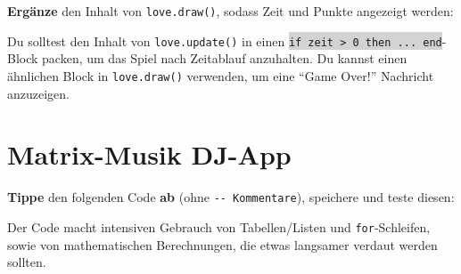 \documentclass[a4paper, 11pt]{article}
\begin{document}
\textbf{Ergänze} den Inhalt von \texttt{love.draw()}, sodass Zeit und Punkte angezeigt werden:



Du solltest den Inhalt von \texttt{love.update()} in einen \colorbox{lightgray}{\texttt{if zeit > 0 then ... end}}-Block packen, um das Spiel nach Zeitablauf anzuhalten. Du kannst einen ähnlichen Block in \texttt{love.draw()} verwenden, um eine "`Game Over!"' Nachricht anzuzeigen.

\newpage

\section{Matrix-Musik DJ-App}

\textbf{Tippe} den folgenden Code \textbf{ab} (ohne \texttt{-{}- Kommentare}), speichere und teste diesen:



Der Code macht intensiven Gebrauch von Tabellen/Listen und \texttt{for}-Schleifen, sowie von mathematischen Berechnungen, die etwas langsamer verdaut werden sollten.
\end{document}
